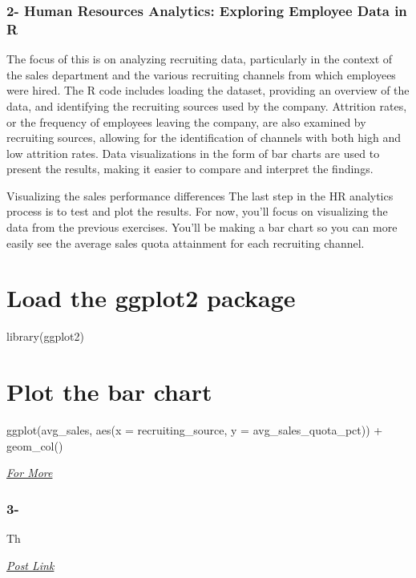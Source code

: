 \documentclass[
  letterpaper,
  DIV=11,
  numbers=noendperiod]{scrreprt}
\begin{document}
\hypertarget{human-resources-analytics-exploring-employee-data-in-r}{%
\subsection{2- Human Resources Analytics: Exploring Employee Data in
R}\label{human-resources-analytics-exploring-employee-data-in-r}}

The focus of this is on analyzing recruiting data, particularly in the
context of the sales department and the various recruiting channels from
which employees were hired. The R code includes loading the dataset,
providing an overview of the data, and identifying the recruiting
sources used by the company. Attrition rates, or the frequency of
employees leaving the company, are also examined by recruiting sources,
allowing for the identification of channels with both high and low
attrition rates. Data visualizations in the form of bar charts are used
to present the results, making it easier to compare and interpret the
findings.

Visualizing the sales performance differences The last step in the HR
analytics process is to test and plot the results. For now, you'll focus
on visualizing the data from the previous exercises. You'll be making a
bar chart so you can more easily see the average sales quota attainment
for each recruiting channel.


\hypertarget{load-the-ggplot2-package}{%
\chapter{Load the ggplot2 package}\label{load-the-ggplot2-package}}

library(ggplot2)


\hypertarget{plot-the-bar-chart}{%
\chapter{Plot the bar chart}\label{plot-the-bar-chart}}

ggplot(avg\_sales, aes(x = recruiting\_source, y =
avg\_sales\_quota\_pct)) + geom\_col()

\href{https://rpubs.com/alifrady/HR_analysis}{\emph{For More}}

\hypertarget{section}{%
\subsection{3-}\label{section}}

Th

\href{https://medium.com/@HalderNilimesh/mastering-data-visualization-in-r-a-comprehensive-guide-to-creating-stunning-visuals-and-f733564a8a41}{\emph{Post
Link}}
\end{document}
